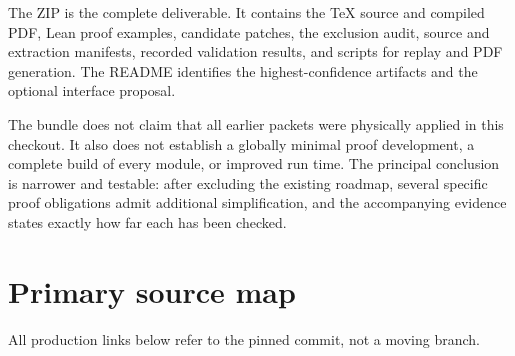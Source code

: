 \documentclass[11pt,letterpaper]{article}
\begin{document}
The ZIP is the complete deliverable. It contains the TeX source and compiled PDF, Lean proof examples, candidate patches, the exclusion audit, source and extraction manifests, recorded validation results, and scripts for replay and PDF generation. The README identifies the highest-confidence artifacts and the optional interface proposal.

The bundle does not claim that all earlier packets were physically applied in this checkout. It also does not establish a globally minimal proof development, a complete build of every module, or improved run time. The principal conclusion is narrower and testable: after excluding the existing roadmap, several specific proof obligations admit additional simplification, and the accompanying evidence states exactly how far each has been checked.

\clearpage
\appendix
\section{Primary source map}

All production links below refer to the pinned commit, not a moving branch.
\end{document}
